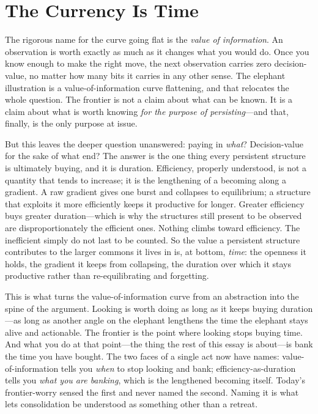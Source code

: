 \documentclass{article}
\begin{document}
\section*{The Currency Is Time}

The rigorous name for the curve going flat is the \textit{value of information}. An observation is worth exactly as much as it changes what you would do. Once you know enough to make the right move, the next observation carries zero decision-value, no matter how many bits it carries in any other sense. The elephant illustration is a value-of-information curve flattening, and that relocates the whole question. The frontier is not a claim about what can be known. It is a claim about what is worth knowing \textit{for the purpose of persisting}---and that, finally, is the only purpose at issue.

But this leaves the deeper question unanswered: paying in \textit{what}? Decision-value for the sake of what end? The answer is the one thing every persistent structure is ultimately buying, and it is duration. Efficiency, properly understood, is not a quantity that tends to increase; it is the lengthening of a becoming along a gradient. A raw gradient gives one burst and collapses to equilibrium; a structure that exploits it more efficiently keeps it productive for longer. Greater efficiency buys greater duration---which is why the structures still present to be observed are disproportionately the efficient ones. Nothing climbs toward efficiency. The inefficient simply do not last to be counted. So the value a persistent structure contributes to the larger commons it lives in is, at bottom, \textit{time}: the openness it holds, the gradient it keeps from collapsing, the duration over which it stays productive rather than re-equilibrating and forgetting.

This is what turns the value-of-information curve from an abstraction into the spine of the argument. Looking is worth doing as long as it keeps buying duration---as long as another angle on the elephant lengthens the time the elephant stays alive and actionable. The frontier is the point where looking stops buying time. And what you do at that point---the thing the rest of this essay is about---is bank the time you have bought. The two faces of a single act now have names: value-of-information tells you \textit{when} to stop looking and bank; efficiency-as-duration tells you \textit{what you are banking}, which is the lengthened becoming itself. Today's frontier-worry sensed the first and never named the second. Naming it is what lets consolidation be understood as something other than a retreat.
\end{document}
